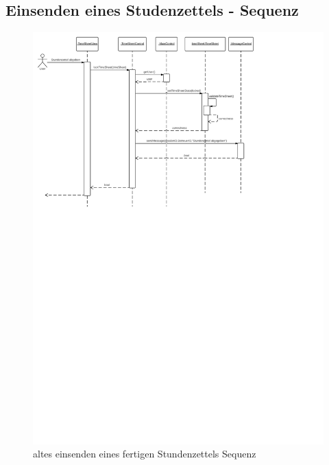         \subsection{Einsenden eines Studenzettels - Sequenz}
                    \begin{figure}
                      \centering
                        \includegraphics[width=\linewidth]{send-in-timesheet.pdf}
                       \caption{altes einsenden eines fertigen Stundenzettels  Sequenz}
                    \end{figure}

